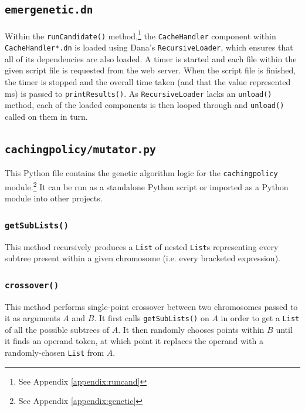 \documentclass[compsoc,12pt,a4paper]{IEEEtran}
\begin{document}
		\subsection{\lstinline|emergenetic.dn|}
		
			Within the \lstinline|runCandidate()| method,\footnote{See Appendix \ref{appendix:runcand}} the \lstinline|CacheHandler| component within \lstinline|CacheHandler*.dn| is loaded using Dana's \lstinline|RecursiveLoader|, which ensures that all of its dependencies are also loaded. A timer is started and each file within the given script file is requested from the web server. When the script file is finished, the timer is stopped and the overall time taken (and that the value represented ms) is passed to \lstinline|printResults()|. As \lstinline|RecursiveLoader| lacks an \lstinline|unload()| method, each of the loaded components is then looped through and \lstinline|unload()| called on them in turn.
		
		\subsection{\lstinline|cachingpolicy/mutator.py|}
		\label{sec:python}
		
			This Python file contains the genetic algorithm logic for the \lstinline|cachingpolicy| module.\footnote{See Appendix \ref{appendix:genetic}} It can be run as a standalone Python script or imported as a Python module into other projects.
		
			\subsubsection{\lstinline|getSubLists()|}
			
				This method recursively produces a \lstinline|List| of nested \lstinline|List|s representing every subtree present within a given chromosome (i.e. every bracketed expression).
			
			\subsubsection{\lstinline|crossover()|}
			
				This method performs single-point crossover between two chromosomes passed to it as arguments $A$ and $B$. It first calls \lstinline|getSubLists()| on $A$ in order to get a \lstinline|List| of all the possible subtrees of $A$. It then randomly chooses points within $B$ until it finds an operand token, at which point it replaces the operand with a randomly-chosen \lstinline|List| from $A$.
			
\end{document}
